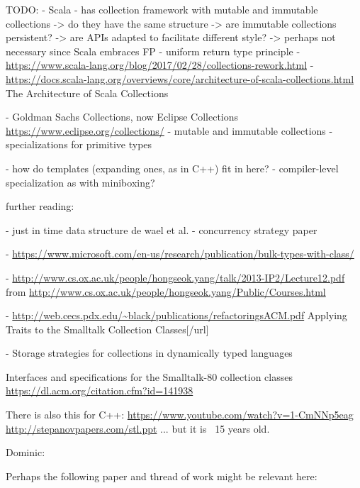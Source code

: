 \documentclass[sigconf, 10pt, review]{acmart}
\begin{document}


\maketitle

\begin{note}
TODO:
- Scala
  - has collection framework with mutable and immutable collections
    -> do they have the same structure 
    -> are immutable collections persistent?
    -> are APIs adapted to facilitate different style?
      -> perhaps not necessary since Scala embraces FP
  - uniform return type principle
  - \url{https://www.scala-lang.org/blog/2017/02/28/collections-rework.html}
 - \url{https://docs.scala-lang.org/overviews/core/architecture-of-scala-collections.html} 
   The Architecture of Scala Collections  

- Goldman Sachs Collections, now Eclipse Collections
\url{https://www.eclipse.org/collections/}
 - mutable and immutable collections
 - specializations for primitive types

- how do templates (expanding ones, as in C++) fit in here?
- compiler-level specialization as with miniboxing?

further reading:

- just in time data structure de wael et al.
- concurrency strategy paper

 - \url{https://www.microsoft.com/en-us/research/publication/bulk-types-with-class/}

 - \url{http://www.cs.ox.ac.uk/people/hongseok.yang/talk/2013-IP2/Lecture12.pdf}
   from \url{http://www.cs.ox.ac.uk/people/hongseok.yang/Public/Courses.html}
 
 - \url{http://web.cecs.pdx.edu/~black/publications/refactoringsACM.pdf}
   Applying Traits to the Smalltalk Collection Classes[/url]
 
 - Storage strategies for collections in dynamically typed languages \citep{Bolz:2013:SSC}

Interfaces and specifications for the Smalltalk-80 collection classes
\url{https://dl.acm.org/citation.cfm?id=141938}


There is also this for C++:
 \url{https://www.youtube.com/watch?v=1-CmNNp5eag}
 \url{http://stepanovpapers.com/stl.ppt}
... but it is ~15 years old.



Dominic:

Perhaps the following paper and thread of work might be relevant here:


\end{note}
\end{document}
